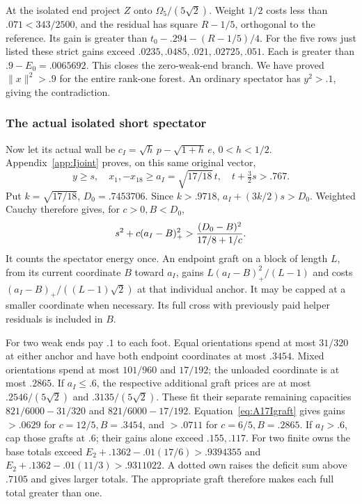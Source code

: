 \documentclass[11pt]{article}
\theoremstyle{definition}
\theoremstyle{remark}
\newcommand{\norm}[1]{\lVert #1\rVert}
\begin{document}
At the isolated end project \(Z\) onto \(\Omega_5/(5\sqrt2)\).
Weight \(1/2\) costs less than \(.071<343/2500\), and the
residual has square \(R-1/5\), orthogonal to the reference.
Its gain is greater than \(t_0-.294-(R-1/5)/4\).
For the five rows just listed these strict gains exceed
\(.0235,.0485,.021,.02725,.051\). Each is greater than
\(.9-E_0=.0065692\). This closes the zero-weak-end branch.
We have proved \(\norm x^2>.9\) for the entire rank-one forest.
An ordinary spectator has \(y^2>.1\), giving the contradiction.

\subsubsection{The actual isolated short spectator}
Now let its actual wall be
\(c_I=\sqrt h\,p-\sqrt{1+h}\,e\), \(0<h<1/2\).
Appendix~\ref{app:Ijoint} proves, on this same original vector,
\[
 y\ge s,\quad x_1,-x_{18}\ge a_I=\sqrt{17/18}\,t,
 \quad t+\tfrac32s>.767.
\]
Put \(k=\sqrt{17/18}\), \(D_0=.7453706\). Since \(k>.9718\),
\(a_I+(3k/2)s>D_0\). Weighted Cauchy therefore gives, for
\(c>0,B<D_0\),
\begin{equation}\label{eq:A17Igraft}
 s^2+c(a_I-B)_+^2>{(D_0-B)^2\over17/8+1/c}.
\end{equation}
It counts the spectator energy once. An endpoint graft on a block
of length \(L\), from its current coordinate \(B\) toward \(a_I\),
gains \(L(a_I-B)_+^2/(L-1)\) and costs
\((a_I-B)_+/((L-1)\sqrt2)\) at that individual anchor.
It may be capped at a smaller coordinate when necessary. Its full
cross with previously paid helper residuals is included in \(B\).

For two weak ends pay \(.1\) to each foot. Equal orientations
spend at most \(31/320\) at either anchor and have both endpoint
coordinates at most \(.3454\). Mixed orientations spend at most
\(101/960\) and \(17/192\); the unloaded coordinate is at most
\(.2865\). If \(a_I\le.6\), the respective additional graft
prices are at most \(.2546/(5\sqrt2)\) and
\(.3135/(5\sqrt2)\). These fit their separate remaining capacities
\(821/6000-31/320\) and \(821/6000-17/192\).
Equation~\eqref{eq:A17Igraft} gives gains \(>.0629\) for
\(c=12/5,B=.3454\), and \(>.0711\) for
\(c=6/5,B=.2865\). If \(a_I>.6\), cap those grafts at
\(.6\); their gains alone exceed \(.155,.117\).
For two finite owns the base totals exceed
\(E_2+.1362-.01(17/6)>.9394355\) and
\(E_2+.1362-.01(11/3)>.9311022\). A dotted own raises the
deficit sum above \(.7105\) and gives larger totals. The appropriate
graft therefore makes each full total greater than one.
\end{document}
